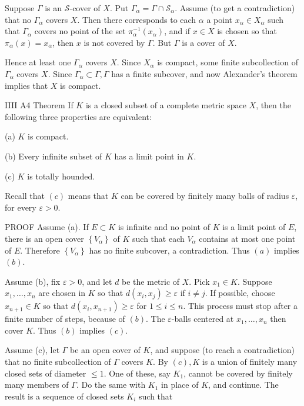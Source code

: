 \documentclass[10pt]{article}
\begin{document}
Suppose $\Gamma$ is an $\mathscr{S}$-cover of $X$. Put $\Gamma_{\alpha}=\Gamma \cap \mathscr{S}_{\alpha}$. Assume (to get a contradiction) that no $\Gamma_{\alpha}$ covers $X$. Then there corresponds to each $\alpha$ a point $x_{\alpha} \in X_{\alpha}$ such that $\Gamma_{\alpha}$ covers no point of the set $\pi_{\alpha}^{-1}\left(x_{\alpha}\right)$, and if $x \in X$ is chosen so that $\pi_{\alpha}(x)=x_{\alpha}$, then $x$ is not covered by $\Gamma$. But $\Gamma$ is a cover of $X$.

Hence at least one $\Gamma_{\alpha}$ covers $X$. Since $X_{\alpha}$ is compact, some finite subcollection of $\Gamma_{\alpha}$ covers $X$. Since $\Gamma_{\alpha} \subset \Gamma, \Gamma$ has a finite subcover, and now Alexander's theorem implies that $X$ is compact.

IIII
A4 Theorem If $K$ is a closed subset of a complete metric space $X$, then the following
three properties are equivalent:

(a) $K$ is compact.

(b) Every infinite subset of $K$ has a limit point in $K$.

(c) $K$ is totally hounded.

Recall that $(c)$ means that $K$ can be covered by finitely many balls of radius $\varepsilon$, for every $\varepsilon>0$.

PROOF Assume (a). If $E \subset K$ is infinite and no point of $K$ is a limit point of $E$, there is an open cover $\left\{V_{\alpha}\right\}$ of $K$ such that each $V_{\alpha}$ contains at most one point of $E$. Therefore $\left\{V_{\alpha}\right\}$ has no finite subcover, a contradiction. Thus $(a)$ implies $(b)$.

Assume (b), fix $\varepsilon>0$, and let $d$ be the metric of $X$. Pick $x_{1} \in K$. Suppose $x_{1}, \ldots, x_{n}$ are chosen in $K$ so that $d\left(x_{i}, x_{j}\right) \geq \varepsilon$ if $i \neq j$. If possible, choose $x_{n+1} \in K$ so that $d\left(x_{i}, x_{n+1}\right) \geq \varepsilon$ for $1 \leq i \leq n$. This process must stop after a finite number of steps, because of $(b)$. The $\varepsilon$-balls centered at $x_{1}, \ldots, x_{n}$ then cover $K$. Thus $(b)$
implies $(c)$.

Assume (c), let $\Gamma$ be an open cover of $K$, and suppose (to reach a contradiction) that no finite subcollection of $\Gamma$ covers $K$. By $(c), K$ is a union of finitely many closed sets of diameter $\leq 1$. One of these, say $K_{1}$, cannot be covered by finitely many members of $\Gamma$. Do the same with $K_{1}$ in place of $K$, and continue. The result is a sequence of
closed sets $K_{i}$ such that
\end{document}
